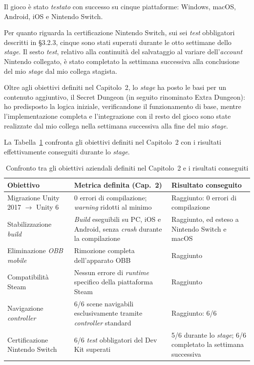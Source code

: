 Il gioco è stato \textit{testato} con successo su cinque piattaforme: Windows, macOS, Android, iOS e Nintendo Switch.
 
Per quanto riguarda la certificazione Nintendo Switch, sui sei \textit{test} obbligatori descritti in \S3.2.3, cinque sono stati superati durante le otto settimane dello \textit{stage}. Il sesto \textit{test}, relativo alla continuità del salvataggio al variare dell'\textit{account} Nintendo collegato, è stato completato la settimana successiva alla conclusione del mio \textit{stage} dal mio collega stagista.
 
 
Oltre agli obiettivi definiti nel Capitolo~2, lo \textit{stage} ha posto le basi per un contenuto aggiuntivo, il Secret Dungeon (in seguito rinominato Extra Dungeon): ho predisposto la logica iniziale, verificandone il funzionamento di base, mentre l'implementazione completa e l'integrazione con il resto del gioco sono state realizzate dal mio collega nella settimana successiva alla fine del mio \textit{stage}.
 
La Tabella~\ref{tab:confronto-obiettivi-risultati} confronta gli obiettivi definiti nel Capitolo~2 con i risultati effettivamente conseguiti durante lo \textit{stage}.
 
\begin{table}[h]
\centering
\begin{tabular}{|p{4cm}|p{4.5cm}|p{4.5cm}|}
\hline
\textbf{Obiettivo} & \textbf{Metrica definita (Cap.~2)} & \textbf{Risultato conseguito} \\
\hline
Migrazione Unity 2017 $\rightarrow$ Unity 6 & 0 errori di compilazione; \textit{warning} ridotti al minimo & Raggiunto: 0 errori di compilazione \\
\hline
Stabilizzazione \textit{build} & \textit{Build} eseguibili su PC, iOS e Android, senza \textit{crash} durante la compilazione & Raggiunto, ed esteso a Nintendo Switch e macOS \\
\hline
Eliminazione \textit{OBB} \textit{mobile} & Rimozione completa dell'apparato OBB & Raggiunto \\
\hline
Compatibilità Steam & Nessun errore di \textit{runtime} specifico della piattaforma Steam & Raggiunto \\
\hline
Navigazione \textit{controller} & 6/6 scene navigabili esclusivamente tramite \textit{controller} standard & Raggiunto: 6/6 \\
\hline
Certificazione Nintendo Switch & 6/6 \textit{test} obbligatori del Dev Kit superati & 5/6 durante lo \textit{stage}; 6/6 completato la settimana successiva \\
\hline
\end{tabular}
\caption{Confronto tra gli obiettivi aziendali definiti nel Capitolo~2 e i risultati conseguiti}
\label{tab:confronto-obiettivi-risultati}
\end{table}
